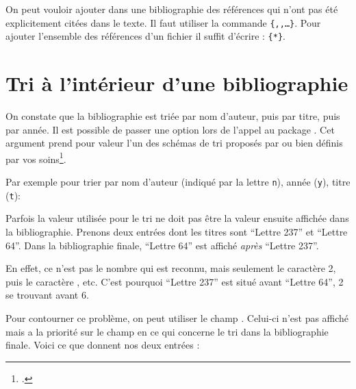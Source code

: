 On peut vouloir ajouter dans une bibliographie des références qui n'ont pas été explicitement citées dans le texte. Il faut  utiliser la commande \verb|{|\verb|,|\verb|,…}|.
Pour ajouter l'ensemble des références d'un fichier  il suffit d'écrire : \verb|{*}|.

\section{Tri à l'intérieur d'une bibliographie}

On constate que la bibliographie est triée par nom d'auteur, puis par titre, puis par année. Il est possible de passer une option  lors de l'appel au package . Cet argument prend pour valeur l'un des schémas de tri proposés par  ou bien définis par vos soins\footcites[Pour les schémas de tri standards voir][]{biblatex_tri}[pour les schémas personnalisés, qui nécessitent l'utilisation de Biber (\cf{} p.~\pageref{biber}), voir][]{biblatex_triperso}.

Par exemple pour trier par nom d'auteur (indiqué par la lettre \verb|n|), année (\verb|y|), titre (\verb|t|):

\begin{latexcode}
\usepackage[sorting=nyt]{biblatex}
\end{latexcode}

Parfois   la valeur utilisée pour le tri ne doit pas être la valeur ensuite affichée dans la bibliographie. Prenons deux entrées dont les titres sont \enquote{Lettre 237} et \enquote{Lettre 64}. Dans la bibliographie finale,
\enquote{Lettre 64} est affiché \emph{après} \enquote{Lettre 237}. 

En effet, ce n'est pas le nombre  qui est reconnu, mais seulement le caractère {2}, puis le caractère , etc. C'est pourquoi \enquote{Lettre 237} est situé avant \enquote{Lettre 64}, 2 se trouvant avant 6.

Pour contourner ce problème, on peut utiliser le champ . Celui-ci n'est pas affiché mais a la priorité sur le  champ  en ce qui concerne le tri dans la bibliographie finale.  Voici ce que donnent nos deux entrées :

\begin{latexcode}
@book{AugustinEpi64,
    Author = {Augustin},
    Sorttitle = {Lettre 064},
    Title = {Lettre 64}}
    
@book{AugustinEpi237,
    Author = {Augustin},
    Sorttitle = {Lettre 237},
    Title = {Lettre 237},
\end{latexcode}

